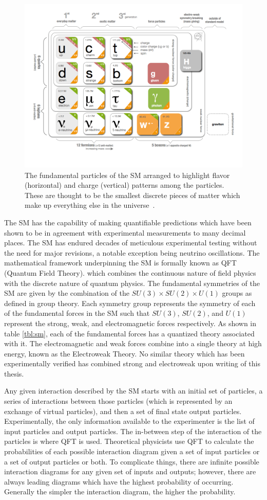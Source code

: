 \begin{figure}[!ht]
\centering
\includegraphics[width=0.65\linewidth]{figs/standard_model_chart.png}
\caption{The fundamental particles of the SM arranged to highlight flavor (horizontal) and charge (vertical) patterns among the particles. These are thought to be the smallest discrete pieces of matter which make up everything else in the universe~\cite{PhysRevD.86.010001}.}
\label{fig:stnd_mdl_chart}
\end{figure}

The SM has the capability of making quantifiable predictions which have been shown to be in agreement with experimental measurements to many decimal places. The SM has endured decades of meticulous experimental testing without the need for major revisions, a notable exception being neutrino oscillations. The mathematical framework underpinning the SM is formally known as QFT (Quantum Field Theory). which combines the continuous nature of field physics with the discrete nature of quantum physics. 
The fundamental symmetries of the SM are given by the combination of the $SU(3)\times SU(2)\times U(1)$ groups as defined in group theory. Each symmetry group represents the symmetry of each of the fundamental forces in the SM such that $SU(3)$, $SU(2)$, and $U(1)$ represent the strong, weak, and electromagnetic forces respectively. As shown in table \ref{tbl:sm}, each of the fundamental forces has a quantized theory associated with it. The electromagnetic and weak forces combine into a single theory at high energy, known as the Electroweak Theory. No similar theory which has been experimentally verified has combined strong and electroweak upon writing of this thesis.

Any given interaction described by the SM starts with an initial set of particles, a series of interactions between those particles (which is represented by an exchange of virtual particles), and then a set of final state output particles. Experimentally, the only information available to the experimenter is the list of input particles and output particles. The in-between step of the interaction of the particles is where QFT is used. Theoretical physicists use QFT to calculate the probabilities of each possible interaction diagram given a set of input particles or a set of output particles or both. To complicate things, there are infinite possible interaction diagrams for any given set of inputs and outputs; however, there are always leading diagrams which have the highest probability of occurring. Generally the simpler the interaction diagram, the higher the probability.

